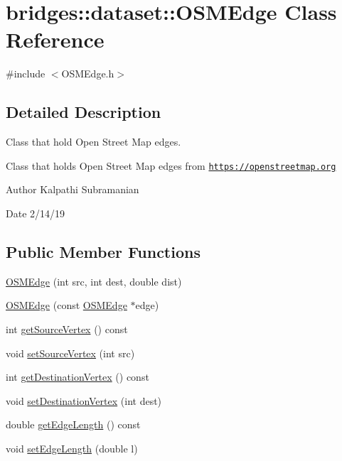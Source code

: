 \hypertarget{classbridges_1_1dataset_1_1_o_s_m_edge}{}\section{bridges\+:\+:dataset\+:\+:O\+S\+M\+Edge Class Reference}
\label{classbridges_1_1dataset_1_1_o_s_m_edge}


{\ttfamily \#include $<$O\+S\+M\+Edge.\+h$>$}



\subsection{Detailed Description}
Class that hold Open Street Map edges. 

Class that holds Open Street Map edges from \href{https://openstreetmap.org}{\tt https\+://openstreetmap.\+org}

\begin{DoxyAuthor}{Author}
Kalpathi Subramanian 
\end{DoxyAuthor}
\begin{DoxyDate}{Date}
2/14/19 
\end{DoxyDate}
\subsection*{Public Member Functions}
\begin{DoxyCompactItemize}
\item 
\hyperlink{classbridges_1_1dataset_1_1_o_s_m_edge_a508445eef72b836a5cacd93f5daa4c58}{O\+S\+M\+Edge} (int src, int dest, double dist)
\item 
\hyperlink{classbridges_1_1dataset_1_1_o_s_m_edge_a8e412f87ed35e5667987de457e5609b6}{O\+S\+M\+Edge} (const \hyperlink{classbridges_1_1dataset_1_1_o_s_m_edge}{O\+S\+M\+Edge} $\ast$edge)
\item 
int \hyperlink{classbridges_1_1dataset_1_1_o_s_m_edge_a0cf6a06814288276a8c2342608d7b088}{get\+Source\+Vertex} () const
\item 
void \hyperlink{classbridges_1_1dataset_1_1_o_s_m_edge_ac8a56c77922a5729b42d1e39f3f6516f}{set\+Source\+Vertex} (int src)
\item 
int \hyperlink{classbridges_1_1dataset_1_1_o_s_m_edge_a691b1bf00e0523524a468a62bb606bcd}{get\+Destination\+Vertex} () const
\item 
void \hyperlink{classbridges_1_1dataset_1_1_o_s_m_edge_ab3b29d3d159aaf0784c88e375f7c218f}{set\+Destination\+Vertex} (int dest)
\item 
double \hyperlink{classbridges_1_1dataset_1_1_o_s_m_edge_a4317cc9c09aa9a5108031185047cb399}{get\+Edge\+Length} () const
\item 
void \hyperlink{classbridges_1_1dataset_1_1_o_s_m_edge_a469d98f2239f245b43d3475cbc8c0e74}{set\+Edge\+Length} (double l)
\end{DoxyCompactItemize}


